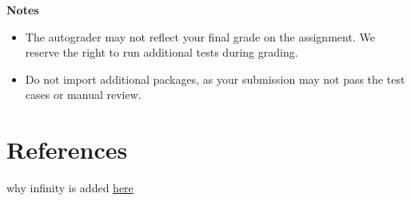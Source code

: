 \documentclass{article}
\begin{document}
    \vspace{3mm}
    \textbf{Notes}
    \begin{itemize}
        \item The autograder may not reflect your final grade on the assignment. We reserve the right to run additional tests during grading.
        \item Do not import additional packages, as your submission may not pass the test cases or manual review.
    \end{itemize}

    

\section*{References}
why infinity is added \href{https://crypto.stackexchange.com/questions/70507/in-elliptic-curve-what-does-the-point-at-infinity-look-like}{here}
    
\end{document}
